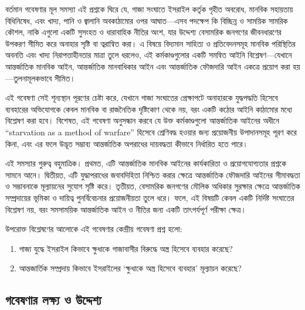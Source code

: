 বর্তমান গবেষণার মূল সমস্যা এই প্রশ্নকে ঘিরে যে, গাজা সংঘাতে ইসরাইল কর্তৃক গৃহীত অবরোধ, মানবিক সহায়তায় বিধিনিষেধ, এবং খাদ্য, পানি ও জ্বালানি অবকাঠামোর ওপর আঘাত---এসব পদক্ষেপ কি বিচ্ছিন্ন ও সাময়িক সামরিক কৌশল, নাকি এগুলো একটি সুসংহত ও ধারাবাহিক নীতির অংশ, যার উদ্দেশ্য বেসামরিক জনগণের জীবনধারণের উপকরণ সীমিত করে অনাহার সৃষ্টি বা ত্বরান্বিত করা। এ বিষয়ে বিদ্যমান সাহিত্য ও প্রতিবেদনসমূহ মানবিক পরিস্থিতির অবনতি এবং খাদ্য নিরাপত্তাহীনতার মাত্রা তুলে ধরলেও, এই কর্মকাণ্ডগুলোর একটি সমন্বিত আইনি বিশ্লেষণ---যেখানে আন্তর্জাতিক মানবিক আইন, আন্তর্জাতিক মানবাধিকার আইন এবং আন্তর্জাতিক ফৌজদারি আইন একত্রে প্রয়োগ করা হয়---তুলনামূলকভাবে সীমিত।

এই গবেষণা সেই শূন্যস্থান পূরণের চেষ্টা করে, যেখানে গাজা সংঘাতের প্রেক্ষাপটে অনাহারকে যুদ্ধপদ্ধতি হিসেবে ব্যবহারের অভিযোগকে কেবল মানবিক বা রাজনৈতিক দৃষ্টিকোণ থেকে নয়, বরং একটি কঠোর আইনি কাঠামোর মধ্যে বিশ্লেষণ করা হবে। বিশেষত, এই গবেষণা অনুসন্ধান করবে যে উক্ত কর্মকাণ্ডগুলো আন্তর্জাতিক আইনের অধীনে ``starvation as a method of warfare'' হিসেবে শ্রেণিবদ্ধ হওয়ার জন্য প্রয়োজনীয় উপাদানসমূহ পূরণ করে কিনা, এবং এর ফলে উদ্ভূত সম্ভাব্য আন্তর্জাতিক অপরাধের দায়বদ্ধতা কীভাবে নির্ধারিত হতে পারে।

এই সমস্যার গুরুত্ব বহুমাত্রিক। প্রথমত, এটি আন্তর্জাতিক মানবিক আইনের কার্যকারিতা ও প্রয়োগযোগ্যতার প্রশ্নকে সামনে আনে। দ্বিতীয়ত, এটি যুদ্ধাপরাধের জবাবদিহিতা নিশ্চিত করার ক্ষেত্রে আন্তর্জাতিক ফৌজদারি আইনের সীমাবদ্ধতা ও সম্ভাবনাকে মূল্যায়নের সুযোগ সৃষ্টি করে। তৃতীয়ত, বেসামরিক জনগণের মৌলিক অধিকার সুরক্ষার ক্ষেত্রে আন্তর্জাতিক সম্প্রদায়ের ভূমিকা ও দায়িত্ব পুনর্বিবেচনার প্রয়োজনীয়তা তুলে ধরে। ফলে, এই বিষয়টি কেবল একটি নির্দিষ্ট সংঘাতের বিশ্লেষণ নয়, বরং সমসাময়িক আন্তর্জাতিক আইন ও নীতির জন্য একটি তাৎপর্যপূর্ণ পরীক্ষা ক্ষেত্র।

উপরোক্ত বিশ্লেষণের আলোকে এই গবেষণার কেন্দ্রীয় গবেষণা প্রশ্ন হলো:

\begin{enumerate}
\renewcommand{\labelenumi}{\bnglnum{enumi}.}
  \item গাজা যুদ্ধে ইসরাইল কিভাবে ক্ষুধাকে গাজাবাসীর বিরুদ্ধে অস্ত্র হিসেবে ব্যবহার করেছে?
  \item আন্তজার্তিক সম্প্রদায় কিভাবে ইসরাইলের `ক্ষুধাকে অস্ত্র হিসেবে ব্যবহার' মূল্যায়ন করেছে?
\end{enumerate}

\subsection{\texorpdfstring{গবেষণার লক্ষ্য ও উদ্দেশ্য}{১.৪ গবেষণার লক্ষ্য ও উদ্দেশ্য}}\label{ux997ux9acux9b7ux9a3ux9b0-ux9b2ux995ux9b7ux9af-ux993-ux989ux9a6ux9a6ux9b6ux9af}

